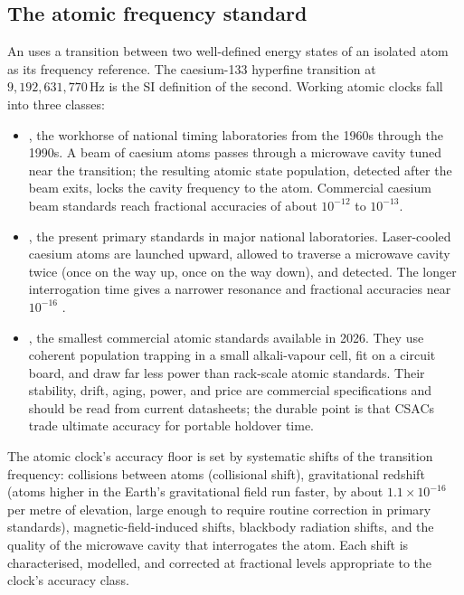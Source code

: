 \subsection{The atomic frequency standard}

An  uses a transition between two well-defined
energy states of an isolated atom as its frequency reference. The
caesium-133 hyperfine transition at $9{,}192{,}631{,}770 \,\si
{\hertz}$ is the SI definition of the second. Working atomic clocks
fall into three classes:

\begin{itemize}[leftmargin=*]
  \item {}, the workhorse of national
    timing laboratories from the 1960s through the 1990s. A beam
    of caesium atoms passes through a microwave cavity tuned near
    the transition; the resulting atomic state population, detected
    after the beam exits, locks the cavity frequency to the atom.
    Commercial caesium beam standards reach fractional accuracies
    of about $10^{-12}$ to $10^{-13}$.
  \item {}, the present primary standards
    in major national laboratories. Laser-cooled caesium atoms are
    launched upward, allowed to traverse a microwave cavity twice
    (once on the way up, once on the way down), and detected. The
    longer interrogation time gives a narrower resonance and
    fractional accuracies near $10^{-16}$
    \cite{web:nist-cesium-fountain}.
  \item {}, the smallest
    commercial atomic standards available in 2026. They use coherent
    population trapping in a small alkali-vapour cell, fit on a
    circuit board, and draw far less power than rack-scale atomic
    standards. Their stability, drift, aging, power, and price are
    commercial specifications and should be read from current
    datasheets; the durable point is that CSACs trade ultimate
    accuracy for portable holdover time.
\end{itemize}

The atomic clock's accuracy floor is set by systematic shifts of the
transition frequency: collisions between atoms (collisional shift),
gravitational redshift (atoms higher in the Earth's gravitational
field run faster, by about $1.1 \times 10^{-16}$ per metre of
elevation, large enough to require routine correction in primary
standards), magnetic-field-induced shifts, blackbody radiation
shifts, and the quality of the microwave cavity that interrogates
the atom. Each shift is characterised, modelled, and corrected at
fractional levels appropriate to the clock's accuracy class.

